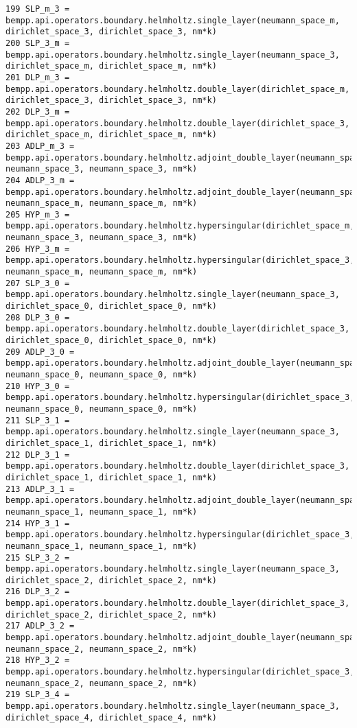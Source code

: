\documentclass[12pt,letterpaper]{report}
\numberwithin{equation}{section}
\begin{document}
\begin{lstlisting}
199 SLP_m_3 = bempp.api.operators.boundary.helmholtz.single_layer(neumann_space_m, dirichlet_space_3, dirichlet_space_3, nm*k)
200 SLP_3_m = bempp.api.operators.boundary.helmholtz.single_layer(neumann_space_3, dirichlet_space_m, dirichlet_space_m, nm*k)
201 DLP_m_3 = bempp.api.operators.boundary.helmholtz.double_layer(dirichlet_space_m, dirichlet_space_3, dirichlet_space_3, nm*k)
202 DLP_3_m = bempp.api.operators.boundary.helmholtz.double_layer(dirichlet_space_3, dirichlet_space_m, dirichlet_space_m, nm*k)
203 ADLP_m_3 = bempp.api.operators.boundary.helmholtz.adjoint_double_layer(neumann_space_m, neumann_space_3, neumann_space_3, nm*k)
204 ADLP_3_m = bempp.api.operators.boundary.helmholtz.adjoint_double_layer(neumann_space_3, neumann_space_m, neumann_space_m, nm*k)
205 HYP_m_3 = bempp.api.operators.boundary.helmholtz.hypersingular(dirichlet_space_m, neumann_space_3, neumann_space_3, nm*k)
206 HYP_3_m = bempp.api.operators.boundary.helmholtz.hypersingular(dirichlet_space_3, neumann_space_m, neumann_space_m, nm*k)
207 SLP_3_0 = bempp.api.operators.boundary.helmholtz.single_layer(neumann_space_3, dirichlet_space_0, dirichlet_space_0, nm*k)
208 DLP_3_0 = bempp.api.operators.boundary.helmholtz.double_layer(dirichlet_space_3, dirichlet_space_0, dirichlet_space_0, nm*k)
209 ADLP_3_0 = bempp.api.operators.boundary.helmholtz.adjoint_double_layer(neumann_space_3, neumann_space_0, neumann_space_0, nm*k)
210 HYP_3_0 = bempp.api.operators.boundary.helmholtz.hypersingular(dirichlet_space_3, neumann_space_0, neumann_space_0, nm*k)
211 SLP_3_1 = bempp.api.operators.boundary.helmholtz.single_layer(neumann_space_3, dirichlet_space_1, dirichlet_space_1, nm*k)
212 DLP_3_1 = bempp.api.operators.boundary.helmholtz.double_layer(dirichlet_space_3, dirichlet_space_1, dirichlet_space_1, nm*k)
213 ADLP_3_1 = bempp.api.operators.boundary.helmholtz.adjoint_double_layer(neumann_space_3, neumann_space_1, neumann_space_1, nm*k)
214 HYP_3_1 = bempp.api.operators.boundary.helmholtz.hypersingular(dirichlet_space_3, neumann_space_1, neumann_space_1, nm*k)
215 SLP_3_2 = bempp.api.operators.boundary.helmholtz.single_layer(neumann_space_3, dirichlet_space_2, dirichlet_space_2, nm*k)
216 DLP_3_2 = bempp.api.operators.boundary.helmholtz.double_layer(dirichlet_space_3, dirichlet_space_2, dirichlet_space_2, nm*k)
217 ADLP_3_2 = bempp.api.operators.boundary.helmholtz.adjoint_double_layer(neumann_space_3, neumann_space_2, neumann_space_2, nm*k)
218 HYP_3_2 = bempp.api.operators.boundary.helmholtz.hypersingular(dirichlet_space_3, neumann_space_2, neumann_space_2, nm*k)
219 SLP_3_4 = bempp.api.operators.boundary.helmholtz.single_layer(neumann_space_3, dirichlet_space_4, dirichlet_space_4, nm*k)

\end{lstlisting}
\end{document}
